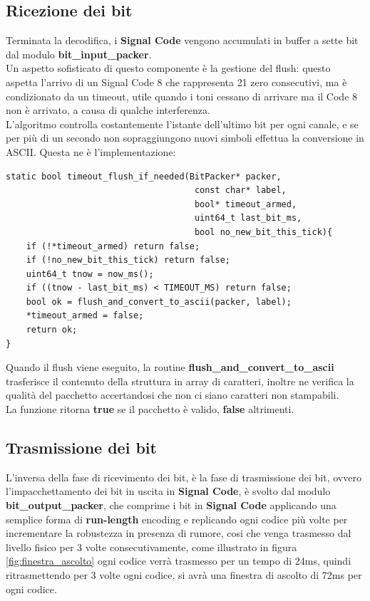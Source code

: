 \subsection{Ricezione dei bit}
Terminata la decodifica, i \textbf{Signal Code} vengono accumulati in buffer a sette bit dal modulo \textbf{bit\_input\_packer}. \\ 
Un aspetto sofisticato di questo componente è la gestione del flush: questo aspetta l'arrivo di un Signal Code 8 che rappresenta 21 zero consecutivi,
ma è condizionato da un timeout, utile quando i toni cessano di arrivare ma il Code 8 non è arrivato, a causa di qualche interferenza. \\
 L’algoritmo controlla costantemente l’istante dell’ultimo bit per ogni canale, e se per più di un secondo non sopraggiungono nuovi simboli effettua la conversione in ASCII.
Questa ne è l'implementazione:

\newpage
\begin{verbatim}
static bool timeout_flush_if_needed(BitPacker* packer,
                                     const char* label,
                                     bool* timeout_armed,
                                     uint64_t last_bit_ms,
                                     bool no_new_bit_this_tick){
    if (!*timeout_armed) return false;
    if (!no_new_bit_this_tick) return false;
    uint64_t tnow = now_ms();
    if ((tnow - last_bit_ms) < TIMEOUT_MS) return false;
    bool ok = flush_and_convert_to_ascii(packer, label);
    *timeout_armed = false;
    return ok;
}
\end{verbatim}

Quando il flush viene eseguito, la routine \textbf{flush\_and\_convert\_to\_ascii} 
trasferisce il contenuto della struttura in array di caratteri, inoltre ne verifica la qualità del pacchetto accertandosi che non ci siano caratteri non stampabili.\\
 La funzione ritorna \textbf{true} se il pacchetto è valido, \textbf{false} altrimenti.

\subsection{Trasmissione dei bit}

 L'inversa della fase di ricevimento dei bit, è la fase di trasmissione dei bit, ovvero l’impacchettamento dei bit in uscita in \textbf{Signal Code}, 
 è svolto dal modulo 
 \textbf{bit\_output\_packer}, che comprime i bit in \textbf{Signal Code} applicando una semplice forma di \textbf{run-length}
  encoding e replicando ogni codice più volte per incrementare la robustezza in presenza di rumore, cosi che venga trasmesso dal livello fisico 
  per 3 volte consecutivamente, come illustrato in figura \autoref{fig:finestra_ascolto} ogni codice verrà trasmesso per un tempo di 24ms, quindi ritrasmettendo 
  per 3 volte ogni codice, si avrà una finestra di ascolto di 72ms per ogni codice.\\

